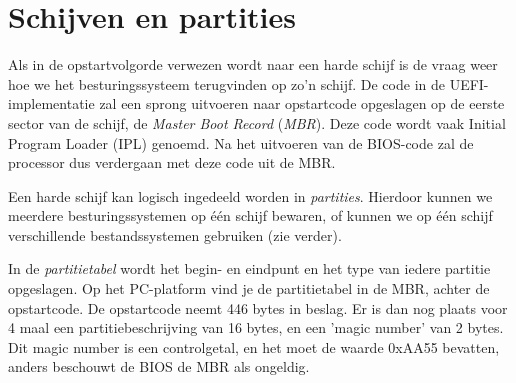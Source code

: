 

\section{Schijven en partities}




Als in de opstartvolgorde verwezen wordt naar een harde schijf
is de vraag weer hoe we het besturingssysteem terugvinden op zo'n
schijf. De code in de UEFI-implementatie zal een sprong uitvoeren naar opstartcode
opgeslagen op de eerste sector van de schijf, de \emph{Master
Boot Record} (\emph{MBR}). Deze code wordt
vaak Initial Program Loader (IPL) genoemd. Na het uitvoeren van de
BIOS-code zal de processor dus verdergaan met deze code uit de
MBR.

Een harde schijf kan logisch ingedeeld worden in
\emph{partities}. Hierdoor kunnen we meerdere
besturingssystemen op \'e\'en schijf bewaren, of kunnen we op \'e\'en schijf
verschillende bestandssystemen gebruiken (zie verder).

In de \emph{partitietabel} wordt het begin- en
eindpunt en het type van iedere partitie opgeslagen. Op het
PC-platform vind je de partitietabel in de MBR, achter de opstartcode.
De opstartcode neemt 446 bytes in beslag. Er is dan nog plaats voor 4
maal een partitiebeschrijving van 16 bytes, en een 'magic number' van
2 bytes. Dit magic number is een controlgetal, en het moet de waarde
0xAA55 bevatten, anders beschouwt de BIOS de MBR als ongeldig.

